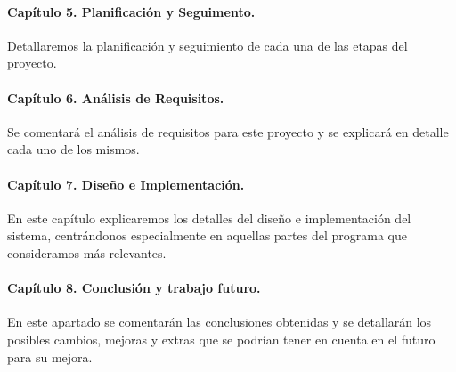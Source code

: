 \paragraph*{Capítulo 5. Planificación y Seguimento.}
Detallaremos la planificación y seguimiento de cada una de las etapas del proyecto. 

\paragraph*{Capítulo 6. Análisis de Requisitos.}
Se comentará el análisis de requisitos para este proyecto y se explicará en detalle cada uno de los mismos.

\paragraph*{Capítulo 7. Diseño e Implementación.}
En este capítulo explicaremos los detalles del diseño e implementación del sistema, centrándonos especialmente en aquellas partes del programa que consideramos más relevantes.

\paragraph*{Capítulo 8. Conclusión y trabajo futuro.}
En este apartado se comentarán las conclusiones obtenidas y se detallarán los posibles cambios, mejoras y extras que se
podrían tener en cuenta en el futuro para su mejora.